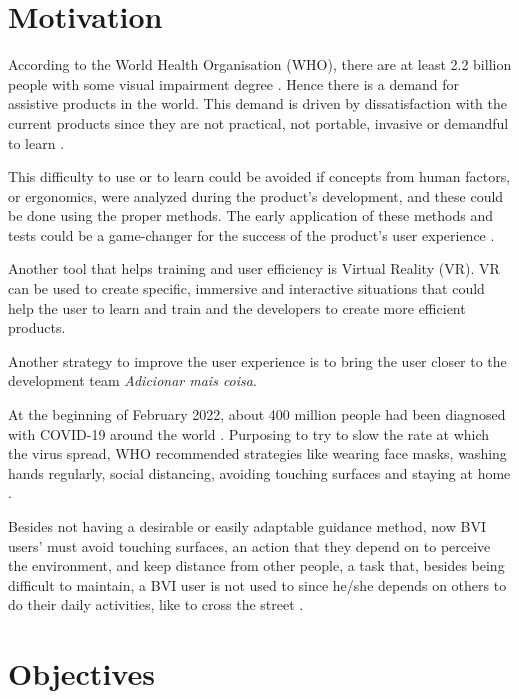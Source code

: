 \section{Motivation}


According to the World Health Organisation (WHO), there are at least 2.2 billion people with some visual impairment degree \cite{world2019world}. Hence there is a demand for assistive products in the world. This demand is driven by dissatisfaction with the current products since they are not practical, not portable, invasive or demandful to learn \cite{lozano2009electrotactile}.

This difficulty to use or to learn could be avoided if concepts from human factors, or ergonomics, were analyzed during the product's development, and these could be done using the proper methods. The early application of these methods and tests could be a game-changer for the success of the product's user experience \cite{wolf2019towards}.

Another tool that helps training and user efficiency is Virtual Reality (VR). VR can be used to create specific, immersive and interactive situations that could help the user to learn and train \cite{farrell2018learning} and the developers to create more efficient products.

Another strategy to improve the user experience is to bring the user closer to the development team {\textit{\large Adicionar mais coisa}}.

At the beginning of February 2022, about 400 million people had been diagnosed with COVID-19 around the world \cite{ourworldindata_cases}. Purposing to try to slow the rate at which the virus spread, WHO recommended strategies like wearing face masks, washing hands regularly, social distancing, avoiding touching surfaces and staying at home \cite{who_2020}.

Besides not having a desirable or easily adaptable guidance method, now BVI users' must avoid touching surfaces, an action that they depend on to perceive the environment, and keep distance from other people, a task that, besides being difficult to maintain, a BVI user is not used to since he/she depends on others to do their daily activities, like to cross the street \cite{jondani2021strategies}.

\section{Objectives}

